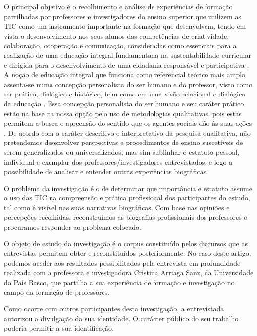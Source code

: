\documentclass{textolivre}
\begin{document}
O principal objetivo é o recolhimento e análise de experiências de formação
partilhadas por professores e investigadores do ensino superior que utilizem as
TIC como um instrumento importante na formação que desenvolvem, tendo em vista
o desenvolvimento nos seus alunos das competências de criatividade,
colaboração, cooperação e comunicação, consideradas como essenciais para a
realização de uma educação integral \cite{ramos2018,comenius1966,fabre2006,reboul1982,freire1998}
fundamentada na sustentabilidade curricular e
dirigida para o desenvolvimento de uma cidadania responsável e participativa
\cite{crue2005,cer1994,copernicus2011,copernicus2020b,fernandes2018}.
A noção de educação integral que funciona como referencial
teórico mais amplo assenta-se numa concepção personalista do ser humano e do
professor, visto como ser prático, dialógico e histórico, bem como em uma visão
relacional e dialógica da educação \cite{ramos2018}. Essa concepção personalista
do ser humano e seu caráter prático estão na base na nossa opção pelo uso de
metodologias qualitativas, pois estas permitem a busca e apreensão do sentido
que os agentes sociais dão às suas ações \cite{ramos2018}. De acordo com o caráter
descritivo e interpretativo da pesquisa qualitativa, não pretendemos
desenvolver perspectivas e procedimentos de ensino suscetíveis de serem
generalizados ou universalizados, mas sim sublinhar o estatuto pessoal,
individual e exemplar dos professores/investigadores entrevistados, e logo a
possibilidade de analisar e entender outras experiências biográficas.

O problema da investigação é o de determinar que importância e estatuto assume
o uso das TIC na compreensão e prática profissional dos participantes do
estudo, tal como é visível nas suas narrativas biográficas. Com base nas
opiniões e percepções recolhidas, reconstruímos as biografias profissionais dos
professores e procuramos responder ao problema colocado.

O objeto de estudo da investigação é o corpus constituído pelos discursos que
as entrevistas permitem obter e reconstituídos posteriormente. No caso deste
artigo, podemos aceder aos resultados possibilitados pela entrevista em
profundidade realizada com a professora e investigadora Cristina Arriaga Sanz,
da Universidade do País Basco, que partilha a sua experiência de formação e
investigação no campo da formação de professores.

Como ocorre com outros participantes desta investigação, a entrevistada
autorizou a divulgação da sua identidade. O carácter público do seu trabalho
poderia permitir a sua identificação.
\end{document}
